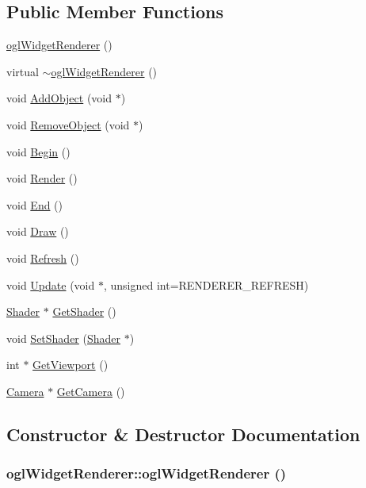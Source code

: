 \subsection*{Public Member Functions}
\begin{CompactItemize}
\item 
\hyperlink{classogl_widget_renderer_2dc88f50d0f77ac6f2b8049e5b5945b9}{oglWidgetRenderer} ()
\item 
virtual \hyperlink{classogl_widget_renderer_b4db2e05b4cf4e0f95a93d0795ea33ad}{$\sim$oglWidgetRenderer} ()
\item 
void \hyperlink{classogl_widget_renderer_c9fcd00dffcc0a44a9bfff90811e586e}{AddObject} (void $\ast$)
\item 
void \hyperlink{classogl_widget_renderer_8438aacf8a1c70dcf1eb5879742d20e8}{RemoveObject} (void $\ast$)
\item 
void \hyperlink{classogl_widget_renderer_1892829478f840e8a0d7032f94af6d26}{Begin} ()
\item 
void \hyperlink{classogl_widget_renderer_fb83427aa814bf2a18f3abded3161bc5}{Render} ()
\item 
void \hyperlink{classogl_widget_renderer_f4f9aab6b1dfc9888de5b9f0504be3e8}{End} ()
\item 
void \hyperlink{classogl_widget_renderer_f4a8764df5f2b79e37d2a23cf268ed44}{Draw} ()
\item 
void \hyperlink{classogl_widget_renderer_098ec7e24496346f9978e6ce03b079ed}{Refresh} ()
\item 
void \hyperlink{classogl_widget_renderer_709ada8aa5e357dd916d48f74adbca07}{Update} (void $\ast$, unsigned int=RENDERER\_\-REFRESH)
\item 
\hyperlink{class_shader}{Shader} $\ast$ \hyperlink{classogl_widget_renderer_43b18c582c133e5fab2c8ce7e3c68033}{GetShader} ()
\item 
void \hyperlink{classogl_widget_renderer_5a63ddb69bee3f4a01510a27a9c2237b}{SetShader} (\hyperlink{class_shader}{Shader} $\ast$)
\item 
int $\ast$ \hyperlink{classogl_widget_renderer_64dc363e1e2cc2393ff8ec635b77bd99}{GetViewport} ()
\item 
\hyperlink{class_camera}{Camera} $\ast$ \hyperlink{classogl_widget_renderer_3c01888abac427988413194909e3e036}{GetCamera} ()
\end{CompactItemize}


\subsection{Constructor \& Destructor Documentation}
\hypertarget{classogl_widget_renderer_2dc88f50d0f77ac6f2b8049e5b5945b9}{
\subsubsection[{oglWidgetRenderer}]{\setlength{\rightskip}{0pt plus 5cm}oglWidgetRenderer::oglWidgetRenderer ()}}
\label{classogl_widget_renderer_2dc88f50d0f77ac6f2b8049e5b5945b9}


